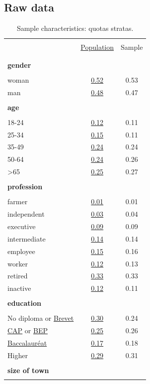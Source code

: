 \documentclass[english,5p,authoryear]{elsarticle}
\renewcommand*\thetable{\Roman{table}}
\begin{document}

\begin{appendices}
\renewcommand{\thetable}{\Alph{section}.\arabic{table}}

\section{Raw data\label{app:Raw-Data}}

\begin{table}[!htbp]
\label{table:sample_characteristics}
\caption{\label{tab:Sample-Characteristics}Sample characteristics: quotas stratas.}
\centering
\begin{tabular}{lcc}
\hline \hline  \\[-1.8ex]
 & \uline{Population} & Sample  \tabularnewline \\[-1.8ex]
\hline  \\[-1.8ex]
\textbf{gender} & & \tabularnewline  \\[-1.8ex]
woman & \uline{0.52} & 0.53\tabularnewline
man & \uline{0.48} & 0.47\tabularnewline
\hline \\[-1.8ex]
\textbf{age} &  & \tabularnewline  \\[-1.8ex]
18-24 & \uline{0.12} & 0.11\tabularnewline
25-34 & \uline{0.15} & 0.11\tabularnewline
35-49 & \uline{0.24} & 0.24\tabularnewline
50-64 & \uline{0.24} & 0.26\tabularnewline
>65 & \uline{0.25} & 0.27\tabularnewline
\hline \\[-1.8ex]
\textbf{profession} &  & \tabularnewline  \\[-1.8ex]
farmer & \uline{0.01} & 0.01\tabularnewline
independent & \uline{0.03} & 0.04\tabularnewline
executive & \uline{0.09} & 0.09\tabularnewline
intermediate & \uline{0.14} & 0.14\tabularnewline
employee & \uline{0.15} & 0.16\tabularnewline
worker & \uline{0.12} & 0.13\tabularnewline
retired & \uline{0.33} & 0.33\tabularnewline
inactive & \uline{0.12} & 0.11\tabularnewline
\hline  \\[-1.8ex]
\textbf{education} &  & \tabularnewline  \\[-1.8ex]
No diploma or \uline{Brevet} & \uline{0.30} & 0.24\tabularnewline
\uline{CAP} or \uline{BEP} & \uline{0.25} & 0.26\tabularnewline
\uline{Baccalauréat} & \uline{0.17} & 0.18\tabularnewline
Higher & \uline{0.29} & 0.31\tabularnewline
\hline  \\[-1.8ex]
\textbf{size of town} &  & \tabularnewline  \\[-1.8ex]

\end{tabular}
\end{table}
\end{appendices}
\end{document}

